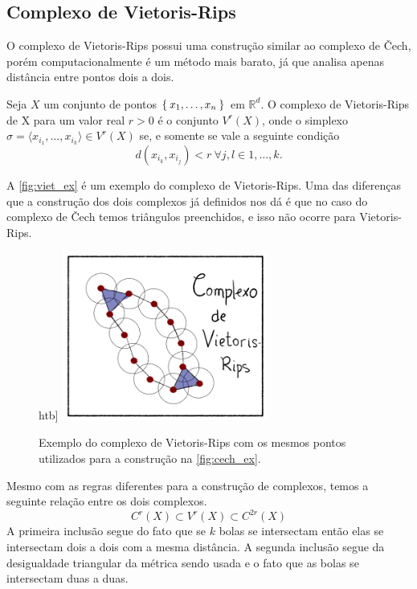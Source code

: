 \subsection{Complexo de Vietoris-Rips}
O complexo de Vietoris-Rips possui uma construção similar ao complexo de \v{C}ech,
porém computacionalmente é um método mais barato, já que analisa apenas distância
entre pontos dois a dois.
\begin{defi}
  Seja $X$ um conjunto de pontos $\Set{x_1, \dots, x_n}$ em $\mathbb{R}^d$. O complexo
  de Vietoris-Rips de X para um valor real $r>0$ é o conjunto $V^r(X)$, onde o simplexo
  $\sigma = \langle x_{i_1}, \dots, x_{i_k} \rangle \in V^r(X)$ se, e somente se vale a seguinte
  condição
  \begin{equation*}
    d(x_{i_k}, x_{i_j}) < r \ \forall j,l \in{1,\dots,k}.
  \end{equation*}
\end{defi}
A \autoref{fig:viet_ex} é um exemplo do complexo de Vietoris-Rips. Uma das diferenças
que a construção dos dois complexos já definidos nos dá é que no caso do complexo
de \v{C}ech temos triângulos preenchidos, e isso não ocorre para Vietoris-Rips.
\begin{figure}[!htpb]
htb]
  \centering
  \includegraphics[width=0.6\textwidth]{images/ComplexRips.png}
  \caption{Exemplo do complexo de Vietoris-Rips com os mesmos pontos utilizados
  para a construção na \autoref{fig:cech_ex}.}
  \label{fig:viet_ex}
  \fautor
\end{figure}

Mesmo com as regras diferentes para a construção de complexos, temos a seguinte
relação entre os dois complexos.
\begin{equation}
  \label{eq:viet_cech}
  C^r(X) \subset V^r(X) \subset C^{2r}(X)
\end{equation}
A primeira inclusão segue do fato que se $k$ bolas se intersectam então elas se
intersectam dois a dois com a mesma distância. A segunda inclusão segue da
desigualdade triangular da métrica sendo usada e o fato que as bolas se
intersectam duas a duas.

